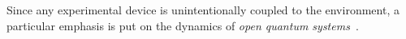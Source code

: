 \begin{comment}

Out-of-equilibrium dynamic phenomena at
phase transitions, such as hysteresis and coarsening,
Kibble-Zurek (KZ) 
\cite{kibble1976topology,kibble1980some,zurek1985cosmological,zurek1996cosmological}
defect production, aging, etc., have
been addressed in a variety of contexts, both
experimentally and theoretically, at classical and quantum
phase transitions (see, e.g., Refs. 
\cite{binder1987theory, cui2020experimentally, bray2002theory, weiler2008spontaneous,
dziarmaga2010dynamics, PSSV-2011-noneqcoll, ulm2013observation} 
and references therein). Out-of-equilibrium scaling behaviors generally
emerge when slowly crossing a critical point, i.e. in
the large scale limit. They depend on the nature of the
classical or quantum transition, its universality class,
and the type of critical dynamics in classical systems, see e.g. Refs. 
\cite{kibble1980some, zurek1996cosmological, dziarmaga2010dynamics, PSSV-2011-noneqcoll}. 
Therefore, slow (quasi-adiabatic) passages through critical points allow us to
probe the universal features of the long-range modes
emerging at thermal and quantum critical phenomena \cite{tarantelli2022out}. 

In particular, the first part of this
work analyzes the application of a round-trip KZ protocol across a continuous quantum
phase transition. We take as paradigmatic model a Kitaev chain \cite{Kitaev_2001} in 
which the chemical potential changes linearity in time, following the function $t/t_s$ 
with the time $t$ and the time scale $t_s$.\\

\end{comment}




Since any experimental device is unintentionally coupled to the environment, a particular emphasis is put on the dynamics of \textit{open quantum systems}~\cite{BP-openquantumsystembook}.

